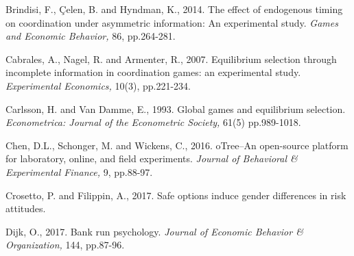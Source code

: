 \documentclass[12pt, letterpaper]{article}
\theoremstyle{plain}
\begin{document}
\begin{thebibliography}{10}

 Brindisi, F., \c{C}elen, B. and Hyndman, K., 2014. The effect of endogenous timing on coordination under asymmetric information: An experimental study. \textit{Games and Economic Behavior,} 86, pp.264-281.

\bibitem{} Cabrales, A., Nagel, R. and Armenter, R., 2007. Equilibrium selection through incomplete information in coordination games: an experimental study. \textit{Experimental Economics,} 10(3), pp.221-234.

\bibitem{} Carlsson, H. and Van Damme, E., 1993. Global games and equilibrium selection. \textit{Econometrica: Journal of the Econometric Society,} 61(5) pp.989-1018.


 Chen, D.L., Schonger, M. and Wickens, C., 2016. oTree--An open-source platform for laboratory, online, and field experiments. \textit{Journal of Behavioral \& Experimental Finance,} 9, pp.88-97.



 Crosetto, P. and Filippin, A., 2017. Safe options induce gender differences in risk attitudes.



 Dijk, O., 2017. Bank run psychology. \textit{Journal of Economic Behavior \& Organization,} 144, pp.87-96.


\end{thebibliography}
\end{document}

